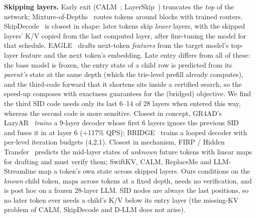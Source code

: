 \documentclass[11pt]{article}
\begin{document}
\textbf{Skipping layers.} Early exit (CALM~\cite{schuster2022}; LayerSkip~\cite{elhoushi2024}) truncates the \emph{top} of the network; Mixture-of-Depths~\cite{raposo2024} routes tokens around blocks with trained routers. SkipDecode~\cite{delcorro2023} is closest in shape: later tokens skip \emph{lower} layers, with the skipped layers' K/V copied from the last computed layer, after fine-tuning the model for that schedule. EAGLE~\cite{li2024eagle} drafts next-token \emph{features} from the target model's top-layer feature and the next token's embedding. Late entry differs from all of these: the base model is frozen, the entry state of a child row is predicted from its \emph{parent's} state at the same depth (which the trie-level prefill already computes), and the third-code forward that it shortens sits inside a certified search, so the speed-up composes with exactness guarantees for the (bridged) objective. We find the third SID code needs only its last 6–14 of 28 layers when entered this way, whereas the second code is more sensitive. Closest in concept, GR4AD's LazyAR~\cite{ax2602.22732} \emph{trains} a 9-layer decoder whose first 6 layers ignore the previous SID and fuses it in at layer 6 (+117\% QPS); BRIDGE~\cite{ax2611.07425} trains a looped decoder with per-level iteration budgets (4,2,1). Closest in mechanism, FIRP / Hidden Transfer~\cite{ax2404.12022} predicts the mid-layer states of \emph{unknown} future tokens with linear maps for drafting and must verify them; SwiftKV, CALM, ReplaceMe and LLM-Streamline map a token's own state across skipped layers. Ours conditions on the \emph{known} child token, maps across tokens at a fixed depth, needs no verification, and is post hoc on a frozen 28-layer LLM. SID nodes are always the last positions, so no later token ever needs a child's K/V below its entry layer (the missing-KV problem of CALM, SkipDecode and D-LLM does not arise).
\end{document}
